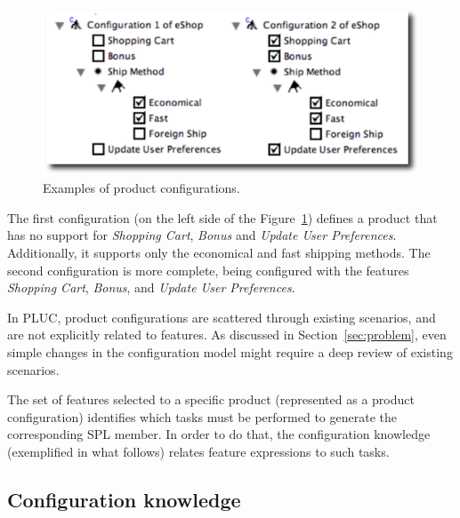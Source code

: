  \begin{figure}[h]
 \begin{center}
  \includegraphics[scale=0.33]{img/pc-04.eps}
   \caption{Examples of product configurations.}
  \label{fig:product-config-01-02}
  \end{center}
\end{figure}


The first configuration (on the left side of the
Figure~\ref{fig:product-config-01-02}) defines a product that has no support for
\emph{Shopping Cart}, \emph{Bonus} and \emph{Update User Preferences}.
Additionally, it supports only the economical and fast shipping methods. The
second configuration is more complete, being configured with the features
\emph{Shopping Cart}, \emph{Bonus}, and \emph{Update User Preferences}.

In PLUC, product configurations are scattered through existing scenarios, and
are not explicitly related to features. As discussed in
Section~\ref{sec:problem}, even simple changes in the configuration model might
require a deep review of existing scenarios.

The set of features selected to a specific product (represented as a product
configuration) identifies which tasks must be performed to
generate the corresponding SPL member. In order to do that, the configuration
knowledge (exemplified in what follows) relates feature expressions to such
tasks.

\subsection{Configuration knowledge}

